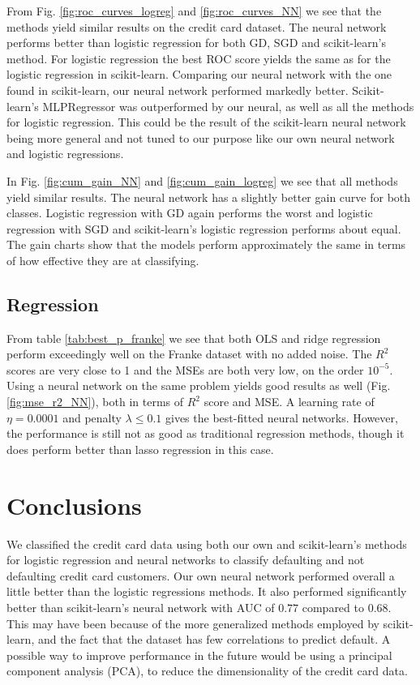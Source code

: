 \documentclass[%
 reprint,
nofootinbib,
 amsmath,amssymb,
 aps,
]{revtex4-2}
\begin{document}
From Fig. \ref{fig:roc_curves_logreg} and \ref{fig:roc_curves_NN} we see that the methods yield similar results on the credit card dataset. The neural network performs better than logistic regression for both GD, SGD and scikit-learn's method. For logistic regression the best ROC score yields the same as for the logistic regression in scikit-learn. Comparing our neural network with the one found in scikit-learn, our neural network performed markedly better. Scikit-learn's MLPRegressor was outperformed by our neural, as well as all the methods for logistic regression. This could be the result of the scikit-learn neural network being more general and not tuned to our purpose like our own neural network and logistic regressions.

In Fig. \ref{fig:cum_gain_NN} and \ref{fig:cum_gain_logreg} we see that all methods yield similar results. The neural network has a slightly better gain curve for both classes. Logistic regression with GD again performs the worst and logistic regression with SGD and scikit-learn's logistic regression performs about equal. The gain charts show that the models perform approximately the same in terms of how effective they are at classifying.


\subsection{Regression}
From table \ref{tab:best_p_franke} we see that both OLS and ridge regression perform exceedingly well on the Franke dataset with no added noise. The $R^2$ scores are very close to 1 and the MSEs are both very low, on the order $10^{-5}$. Using a neural network on the same problem yields good results as well (Fig. \ref{fig:mse_r2_NN}), both in terms of $R^2$ score and MSE. A learning rate of $\eta =  0.0001$ and penalty $\lambda \leq 0.1$ gives the best-fitted neural networks. However, the performance is still not as good as traditional regression methods, though it does perform better than lasso regression in this case.

\section{Conclusions}
We classified the credit card data using both our own and scikit-learn's methods for logistic regression and neural networks to classify defaulting and not defaulting credit card customers. Our own neural network performed overall a little better than the logistic regressions methods. It also performed significantly better than scikit-learn's neural network with AUC of $0.77$ compared to $0.68$. This may have been because of the more generalized methods employed by scikit-learn, and the fact that the dataset has few correlations to predict default. A possible way to improve performance in the future would be using a principal component analysis (PCA), to reduce the dimensionality of the credit card data.
\end{document}
